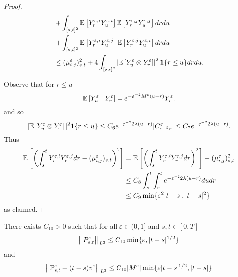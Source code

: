 \documentclass{article}
\begin{document}
\begin{proof}
\begin{align*}
&+ \int_{[s,t]^2}  \EEE{Y^{\varepsilon,i}_r Y^{\varepsilon,i}_u}\EEE{Y^{\varepsilon,j}_r Y^{\varepsilon,j}_u} dr du \\
&+ \int_{[s,t]^2}  \EEE{Y^{\varepsilon,i}_r Y^{\varepsilon,j}_u}\EEE{Y^{\varepsilon,j}_r Y^{\varepsilon,i}_u} dr du \\
&\leq (\mu_{i,j}^\varepsilon)_{s,t}^2 + 4\int_{[s,t]^2} \left|\EEE{Y^{\varepsilon}_u \otimes Y^{\varepsilon}_r}\right|^2 \mathbf{1}\{r \leq u\} dr du.
\end{align*}

Observe that for $r \leq u$
\[
\EEE{Y^\varepsilon_u \mid Y^\varepsilon_r} = e^{-\varepsilon^{-2} M^\varepsilon(u-r)} Y_r^\varepsilon.
\]
and so
\[
|\EEE{Y^\varepsilon_u\otimes Y^\varepsilon_r}|^2 \mathbf{1}\{r \leq u\}  \leq C_6 e^{-\varepsilon^{-2}2\lambda(u-r)} |C^\varepsilon_{\varepsilon^{-2}r}| \leq C_7 e^{-\varepsilon^{-2}2\lambda(u-r)}.
\]
Thus
\begin{align*}
\EEE{\left(\int_s^t Y^{\varepsilon,i}_r Y^{\varepsilon,j}_r dr - (\mu_{i,j}^\varepsilon)_{s,t}\right)^2}
&= \EEE{\left(\int_s^t Y^{\varepsilon,i}_r Y^{\varepsilon,j}_r dr\right)^2} - (\mu_{i,j}^\varepsilon)_{s,t}^2 \\
&\leq C_8 \int_s^t \int_r^t e^{-\varepsilon^{-2}2\lambda(u-r)} du dr \\
&\leq C_9 \min\{\varepsilon^2 |t-s|, |t-s|^2\}
\end{align*}
as claimed.
\end{proof}

\begin{lemma}\label{lem:PBounds}
There exists $C_{10} > 0$ such that for all $\varepsilon \in (0,1]$ and $s,t \in [0,T]$
\[
\norm{P^\varepsilon_{s,t}}_{L^2} \leq C_{10} \min\{\varepsilon, |t-s|^{1/2}\}
\]
and
\[
\norm{\Pbb^\varepsilon_{s,t} + (t-s)v^\varepsilon}_{L^2} \leq C_{10} |M^\varepsilon| \min\{\varepsilon |t-s|^{1/2}, |t-s|\}
\]
\end{lemma}
\end{document}
